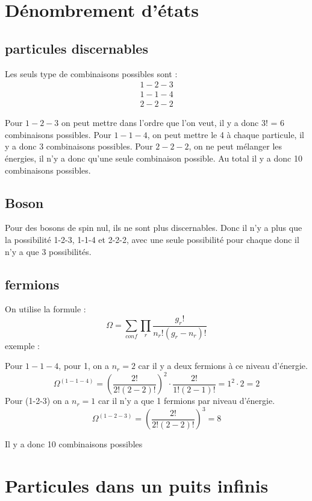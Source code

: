 \documentclass[12pt,a4paper]{article}
\author{Malo Kerebel}
\begin{document}
\section{Dénombrement d'états}

\subsection{particules discernables}
Les seuls type de combinaisons possibles sont :
\begin{align*}
	1-2-3\\
	1-1-4\\
	2-2-2
\end{align*}

Pour \(1-2-3\) on peut mettre dans l'ordre que l'on veut, il y a donc 3! = 6 combinaisons possibles. Pour \(1-1-4\), on peut mettre le 4 à chaque particule, il y a donc 3 combinaisons possibles. Pour \(2-2-2\), on ne peut mélanger les énergies, il n'y a donc qu'une seule combinaison possible. Au total il y a donc 10 combinaisons possibles.

\subsection{Boson}

Pour des bosons de spin nul, ils ne sont plus discernables. Donc il n'y a plus que la possibilité 1-2-3, 1-1-4 et 2-2-2, avec une seule possibilité pour chaque donc il n'y a que 3 possibilités.

\subsection{fermions}

On utilise la formule :
\[
	\Omega = \sum_{conf} \prod_r \dfrac{g_r!}{n_r!(g_r-n_r)!}
\]
exemple :

Pour \(1-1-4\), pour 1, on a \(n_r = 2\) car il y a deux fermions à ce niveau d'énergie.
\[
	\Omega^{(1-1-4)} = \left( \dfrac{2!}{2! (2-2)!} \right)^2 \cdot \dfrac{2!}{1!(2-1)!} = 1^2 \cdot 2 = 2
\]
Pour (1-2-3) on a \(n_r = 1\) car il n'y a que 1 fermions par niveau d'énergie. 
\[
	\Omega^{(1-2-3)} = \left( \dfrac{2!}{2!(2-2)!} \right)^3 = 8
\]

Il y a donc 10 combinaisons possibles

\section{Particules dans un puits infinis}
\end{document}
